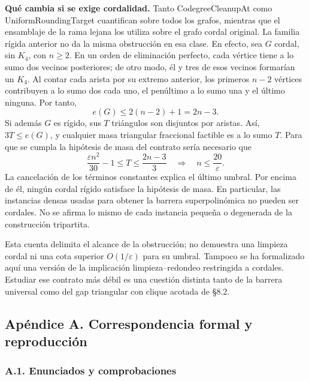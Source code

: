 \documentclass[spanish,11pt,a4paper]{article}
\begin{document}
\textbf{Qué cambia si se exige cordalidad.} Tanto {\ttfamily\small CodegreeClea\discretionary{\hbox{\ensuremath{\hookrightarrow}}}{}{}nupAt} como {\ttfamily\small UniformRound\discretionary{\hbox{\ensuremath{\hookrightarrow}}}{}{}ingTarget} cuantifican sobre todos los grafos, mientras que el ensamblaje de la rama lejana los utiliza sobre el grafo cordal original. La familia rígida anterior no da la misma obstrucción en esa clase. En efecto, sea \(G\) cordal, sin \(K_4\), con \(n\ge2\). En un orden de eliminación perfecto, cada vértice tiene a lo sumo dos vecinos posteriores; de otro modo, él y tres de esos vecinos formarían un \(K_4\). Al contar cada arista por su extremo anterior, los primeros \(n-2\) vértices contribuyen a lo sumo dos cada uno, el penúltimo a lo sumo una y el último ninguna. Por tanto, \[
e(G)\le2(n-2)+1=2n-3.
\tag{8.4}
\] Si además \(G\) es rígido, sus \(T\) triángulos son disjuntos por aristas. Así, \(3T\le e(G)\), y cualquier masa triangular fraccional factible es a lo sumo \(T\). Para que se cumpla la hipótesis de masa del contrato sería necesario que \[
\frac{\varepsilon n^2}{30}-1
\le T\le\frac{2n-3}{3}
\quad\Longrightarrow\quad n\le\frac{20}{\varepsilon}.
\tag{8.5}
\] La cancelación de los términos constantes explica el último umbral. Por encima de él, ningún cordal rígido satisface la hipótesis de masa. En particular, las instancias densas usadas para obtener la barrera superpolinómica no pueden ser cordales. No se afirma lo mismo de cada instancia pequeña o degenerada de la construcción tripartita.

Esta cuenta delimita el alcance de la obstrucción; no demuestra una limpieza cordal ni una cota superior \(O(1/\varepsilon)\) para su umbral. Tampoco se ha formalizado aquí una versión de la implicación limpieza--redondeo restringida a cordales. Estudiar ese contrato más débil es una cuestión distinta tanto de la barrera universal como del gap triangular con clique acotada de §8.2.

\subsection{Apéndice A. Correspondencia formal y reproducción}\label{apendice-a.-correspondencia-formal-y-reproduccion}

\subsubsection{A.1. Enunciados y comprobaciones}\label{a.1.-enunciados-y-comprobaciones}
\end{document}
